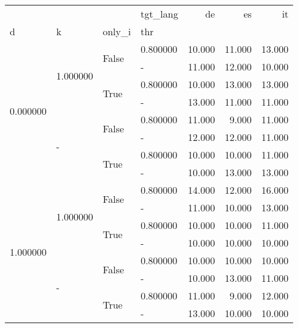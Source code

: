\begin{tabular}{llllrrr}
  \toprule
  &  &  & tgt\_lang & de & es & it \\
  d & k & only\_i & thr &  &  &  \\
  \midrule
  \multirow[t]{8}{*}{0.000000} & \multirow[t]{4}{*}{1.000000} & \multirow[t]{2}{*}{False} & 0.800000 & 10.000 & 11.000 & 13.000 \\
  &  &  & - & 11.000 & 12.000 & 10.000 \\
  \cline{3-7}
  &  & \multirow[t]{2}{*}{True} & 0.800000 & 10.000 & 13.000 & 13.000 \\
  &  &  & - & 13.000 & 11.000 & 11.000 \\
  \cline{2-7} \cline{3-7}
  & \multirow[t]{4}{*}{-} & \multirow[t]{2}{*}{False} & 0.800000 & 11.000 & 9.000 & 11.000 \\
  &  &  & - & 12.000 & 12.000 & 11.000 \\
  \cline{3-7}
  &  & \multirow[t]{2}{*}{True} & 0.800000 & 10.000 & 10.000 & 11.000 \\
  &  &  & - & 10.000 & 13.000 & 13.000 \\
  \cline{1-7} \cline{2-7} \cline{3-7}
  \multirow[t]{8}{*}{1.000000} & \multirow[t]{4}{*}{1.000000} & \multirow[t]{2}{*}{False} & 0.800000 & 14.000 & 12.000 & 16.000 \\
  &  &  & - & 11.000 & 10.000 & 13.000 \\
  \cline{3-7}
  &  & \multirow[t]{2}{*}{True} & 0.800000 & 10.000 & 10.000 & 11.000 \\
  &  &  & - & 10.000 & 10.000 & 10.000 \\
  \cline{2-7} \cline{3-7}
  & \multirow[t]{4}{*}{-} & \multirow[t]{2}{*}{False} & 0.800000 & 10.000 & 10.000 & 10.000 \\
  &  &  & - & 10.000 & 13.000 & 11.000 \\
  \cline{3-7}
  &  & \multirow[t]{2}{*}{True} & 0.800000 & 11.000 & 9.000 & 12.000 \\
  &  &  & - & 13.000 & 10.000 & 10.000 \\
  \cline{1-7} \cline{2-7} \cline{3-7}
  \bottomrule
\end{tabular}
